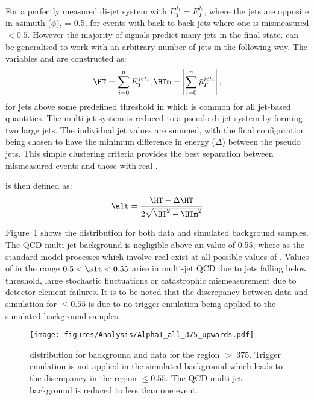 For a perfectly measured di-jet system with $E_{T}^{j_{1}} = E_{T}^{j_{2}}$, 
where the jets are opposite in azimuth ($\phi$), \alt = 0.5, for events with back to back jets where one is mismeasured \alt $ < 0.5$.
However the majority of signals predict many jets in the final state.
\alt can be generalised to work with an arbitrary number of jets in the following way. The variables \HT and \HTm are constructed as:
\begin{equation}
  \HT = \sum_{i = 0}^{n}E_{T}^{jet_{i}}, \\
  \HTm = \left|\sum_{i = 0}^{n}\bar{p}_{T}^{jet_{i}}\right|,
\end{equation}
for jets above some predefined threshold in \ET which is common for all jet-based quantities. The multi-jet system is reduced to a pseudo di-jet system by forming two large jets. The individual jet \ET values are summed, with the final configuration being chosen to have the minimum difference in energy 
($\Delta$\HT) between the pseudo jets. This simple clustering criteria provides 
the best separation between mismeasured events and those with real \MET\cite{0}.

\alt is then defined as:
\begin{equation}
  \alt = \frac{\HT - \Delta\HT}{2\sqrt{\HT^{2}-\HTm^{2}}}
\end{equation}


Figure~\ref{fig:figures_Analysis_AlphaT_all_375_upwards} shows the \alt 
distribution for both data and simulated background samples. The QCD multi-jet 
background is negligible above an \alt value of 0.55, where as the standard 
model processes which involve real \MET exist at all possible values of \alt.
Values of \alt in the range $0.5 < \alt < 0.55$ arise in multi-jet QCD due to 
jets falling below threshold, large stochastic fluctuations or catastrophic mismeasurement due to detector element failures.
It is to be noted that the discrepancy between data and simulation for \alt 
$\leq 0.55$ is due to no trigger emulation being applied to the simulated 
background samples.
\begin{figure}[ht|]
  \centering  \texttt{[image: figures/Analysis/AlphaT\_all\_375\_upwards.pdf]}
  \caption{\alt distribution for background and data for the region \HT $>$ 
  \unit{375}{\GeV}. Trigger emulation is not applied in the simulated 
  background which leads to the discrepancy in the region \alt $\leq 0.55$. The 
  QCD multi-jet background is reduced to less than one event.}
  \label{fig:figures_Analysis_AlphaT_all_375_upwards}
\end{figure}

